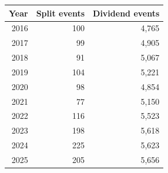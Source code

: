 \begin{tabular}{@{}rrr@{}}
\toprule
Year & Split events & Dividend events \\
\midrule
2016 & 100 & 4,765 \\
2017 & 99 & 4,905 \\
2018 & 91 & 5,067 \\
2019 & 104 & 5,221 \\
2020 & 98 & 4,854 \\
2021 & 77 & 5,150 \\
2022 & 116 & 5,523 \\
2023 & 198 & 5,618 \\
2024 & 225 & 5,623 \\
2025 & 205 & 5,656 \\
\bottomrule
\end{tabular}
